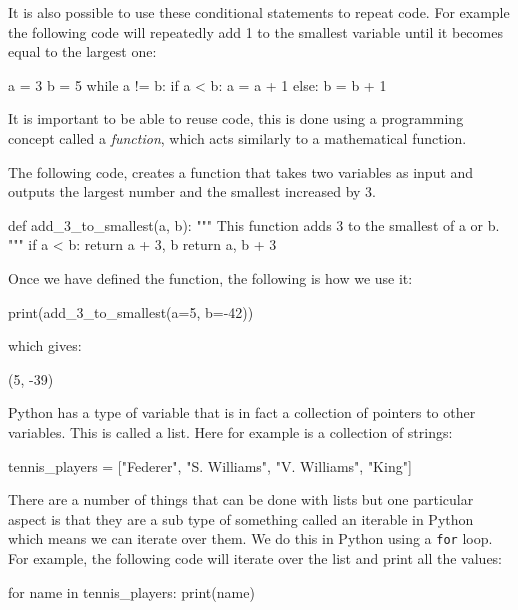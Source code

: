 It is also possible to use these conditional statements to repeat code. For
example the following code will repeatedly add 1 to the smallest variable until
it becomes equal to the largest one:

\begin{pyin}
a = 3
b = 5
while a != b:
    if a < b:
        a = a + 1
    else:
        b = b + 1
\end{pyin}

It is important to be able to reuse code, this is done using a programming
concept called a \textit{function}, which acts similarly to a mathematical
function.

The following code, creates a function that takes two variables as input and
outputs the largest number and the smallest increased by 3.

\begin{pyin}
def add_3_to_smallest(a, b):
    """ 
    This function adds 3 to the smallest of a or b.
    """
    if a < b:
        return a + 3, b
    return a, b + 3
\end{pyin}

Once we have defined the function, the following is how we use it:

\begin{pyin}
print(add_3_to_smallest(a=5, b=-42))
\end{pyin}

which gives:

\begin{pyout}
(5, -39)
\end{pyout}

Python has a type of variable that is in fact a collection of pointers to other
variables. This is called a list. Here for example is a collection of strings:

\begin{pyin}
tennis_players = ["Federer", "S. Williams", "V. Williams", "King"]
\end{pyin}

There are a number of things that can be done with lists but one particular
aspect is that they are a sub type of something called an iterable in Python
which means we can iterate over them. We do this in Python using a
\texttt{for} loop. For example, the following code will iterate over
the list and print all the values:

\begin{pyin}
for name in tennis_players:
    print(name)
\end{pyin}


